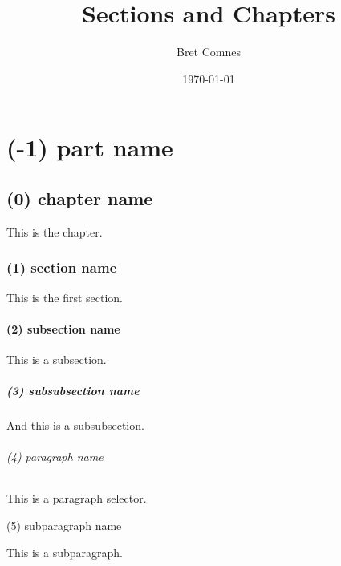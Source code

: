 \documentclass{report}
\title{Sections and Chapters}
\author{Bret Comnes}
\date{\today}
\begin{document}
\maketitle
\part{(-1) part name} %
\label{prt:part_name}

\chapter{(0) chapter name} %
\label{cha:chapter_name}
This is the chapter.

\section{(1) section name} %
\label{sec:section_name}
This is the first section.

\subsection{(2) subsection name} %
\label{sub:subsection_name}
This is a subsection.

\subsubsection{(3) subsubsection name} %
\label{ssub:subsubsection_name}
And this is a subsubsection.

\paragraph{(4) paragraph name} %
\label{par:paragraph_name}
This is a paragraph selector.

\subparagraph{(5) subparagraph name} %
\label{subp:subparagraph_name}
This is a subparagraph.
\end{document}
